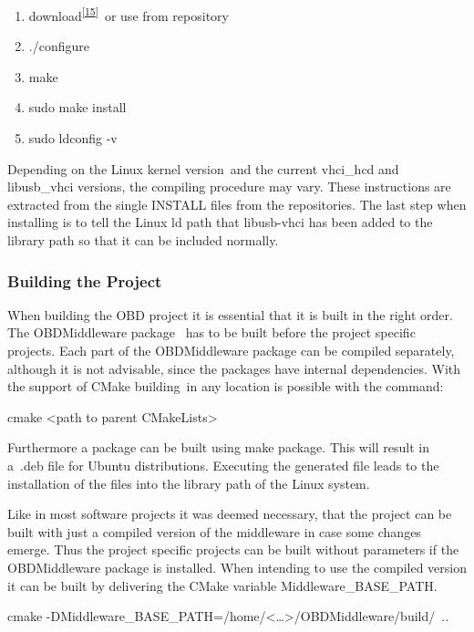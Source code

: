 \begin{enumerate}
\tightlist
\item
  {download}\textsuperscript{\protect\hyperlink{ftnt15}{{[}15{]}}}{~or
  use from repository}
\item
  {./configure}
\item
  {make}
\item
  {sudo make install}
\item
  {sudo ldconfig -v }
\end{enumerate}

{Depending on the Linux kernel version}{~}{and the current vhci\_hcd and
libusb\_vhci versions, the compiling procedure may vary. These
instructions are extracted from the single INSTALL files from the
repositories. The last step when installing is to tell the Linux ld path
that libusb-vhci has been added to the library path so that it can be
included normally.}

\hypertarget{h.73mzfu9s6v0d}{\subsubsection{\texorpdfstring{{Building
the Project}}{Building the Project}}\label{h.73mzfu9s6v0d}}

{When building the OBD project it is essential that it is built in the
right order. The OBDMiddleware package ~has to be built before the
project specific projects. Each part of the OBDMiddleware package can be
compiled separately, although it is not advisable, since the packages
have internal dependencies. With the support of CMake }{building}{~in
any location is possible with the command:}

{cmake \textless{}path to parent CMakeLists\textgreater{} }

{Furthermore a package can be built using }{make package}{. }{This will
result in a}{~.deb file for Ubuntu distributions. Executing the
generated file leads to the installation of the files into the library
path of the Linux system. }

{Like in most software projects it was deemed necessary, that the
project can be built with just a compiled version of the middleware in
case some changes emerge. Thus the project specific projects can be
built without parameters if the OBDMiddleware package is installed. When
intending to use the compiled version it can be built by delivering the
CMake variable Middleware\_BASE\_PATH. }

{cmake
}{-}{DMiddleware\_BASE\_PATH}{=}{/home/}{\textless{}\ldots{}\textgreater{}/}{OBDMiddleware}{/}{build}{/}{~}{..}

